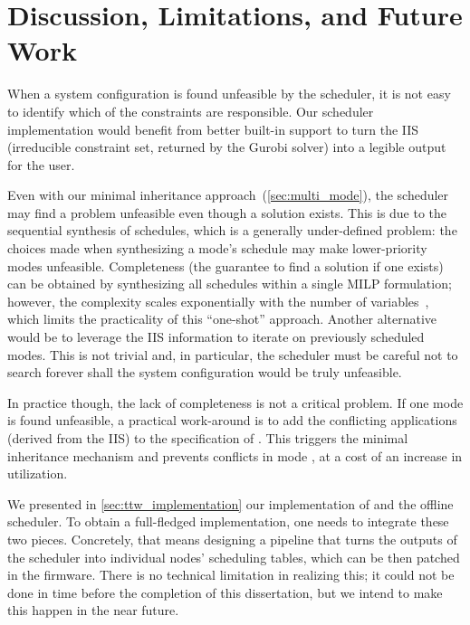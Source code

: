 \section{Discussion, Limitations, and Future Work}

When a system configuration is found unfeasible by the \TTW scheduler, it is not easy to identify which of the constraints are responsible. Our scheduler implementation would benefit from better built-in support to turn the IIS (irreducible constraint set, returned by the Gurobi solver) into a legible output for the user.

Even with our minimal inheritance approach~(\cref{sec:multi_mode}), the \TTW scheduler may find a problem unfeasible even though a solution exists.
This is due to the sequential synthesis of schedules, which is a generally under-defined problem: the choices made when synthesizing a mode's schedule may make lower-priority modes unfeasible.
Completeness (the guarantee to find a solution if one exists) can be obtained by synthesizing all schedules within a single MILP formulation; however, the complexity scales exponentially with the number of variables~\cite{jeffay1991nonpreemptive}, which limits the practicality of this ``one-shot'' approach.
Another alternative would be to leverage the IIS information to iterate on previously scheduled modes.
This is not trivial and, in particular, the scheduler must be careful not to search forever
shall the system configuration would be truly unfeasible.

In practice though, the lack of completeness is not a critical problem. If one mode \modeany is found unfeasible, a practical work-around is to add the conflicting applications (derived from the IIS) to the specification of \modeany.
This triggers the minimal inheritance mechanism and prevents conflicts in mode \mode, at a cost of an increase in utilization.

We presented in \cref{sec:ttw_implementation} our implementation of \TTnet and the offline \TTW scheduler.
To obtain a full-fledged \TTW implementation, one needs to integrate these two pieces. Concretely, that means designing a pipeline that turns the outputs of the \TTW scheduler into individual nodes' scheduling tables, which can be then patched in the \TTnet firmware.
There is no technical limitation in realizing this; it could not be done in time before the completion of this dissertation, but we intend to make this happen in the near future.

